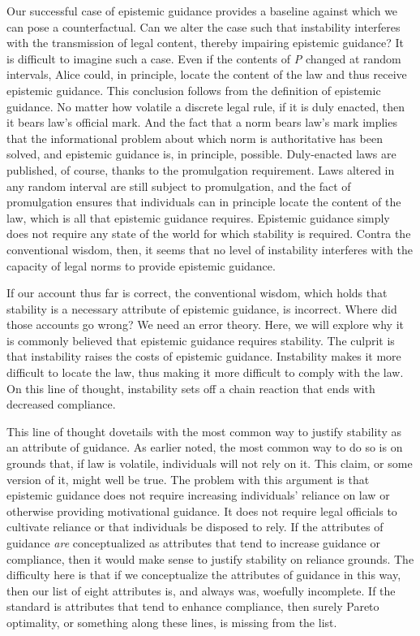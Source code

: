 Our successful case of epistemic guidance provides a baseline against
which we can pose a counterfactual. Can we alter the case such that
instability interferes with the transmission of legal content, thereby
impairing epistemic guidance? It is difficult to imagine such a case.
Even if the contents of \emph{P} changed at random intervals, Alice
could, in principle, locate the content of the law and thus receive
epistemic guidance. This conclusion follows from the definition of
epistemic guidance. No matter how volatile a discrete legal rule, if it
is duly enacted, then it bears law's official mark. And the fact that a
norm bears law's mark implies that the informational problem about which
norm is authoritative has been solved, and epistemic guidance is, in
principle, possible. Duly-enacted laws are published, of course, thanks
to the promulgation requirement. Laws altered in any random interval are
still subject to promulgation, and the fact of promulgation ensures that
individuals can in principle locate the content of the law, which is all
that epistemic guidance requires. Epistemic guidance simply does not
require any state of the world for which stability is required. Contra
the conventional wisdom, then, it seems that no level of instability
interferes with the capacity of legal norms to provide epistemic
guidance.

If our account thus far is correct, the conventional wisdom, which holds
that stability is a necessary attribute of epistemic guidance, is
incorrect. Where did those accounts go wrong? We need an error theory.
Here, we will explore why it is commonly believed that epistemic
guidance requires stability. The culprit is that instability raises the
costs of epistemic guidance. Instability makes it more difficult to
locate the law, thus making it more difficult to comply with the law. On
this line of thought, instability sets off a chain reaction that ends
with decreased compliance.

This line of thought dovetails with the most common way to justify
stability as an attribute of guidance. As earlier noted, the most common
way to do so is on grounds that, if law is volatile, individuals will
not rely on it. This claim, or some version of it, might well be true.
The problem with this argument is that epistemic guidance does not
require increasing individuals' reliance on law or otherwise providing
motivational guidance. It does not require legal officials to cultivate
reliance or that individuals be disposed to rely. If the attributes of
guidance \emph{are} conceptualized as attributes that tend to increase
guidance or compliance, then it would make sense to justify stability on
reliance grounds. The difficulty here is that if we conceptualize the
attributes of guidance in this way, then our list of eight attributes
is, and always was, woefully incomplete. If the standard is attributes
that tend to enhance compliance, then surely Pareto optimality, or
something along these lines, is missing from the list.

